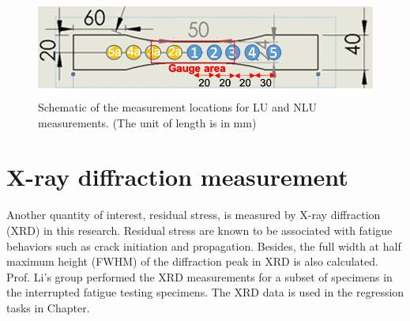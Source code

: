 \begin{figure}[tb]
  \includegraphics[width=\linewidth]{fig/specimen_measurment_locs.png}
  \caption{Schematic of the measurement locations for LU and NLU measurements. (The unit of length is in mm)}
  \label{fig: measurement locations}
\end{figure}

\section{X-ray diffraction measurement}
Another quantity of interest, residual stress, is measured by X-ray diffraction (XRD) in this research. Residual stress are known to be associated with fatigue behaviors such as crack initiation and propagation. Besides, the full width at half maximum height (FWHM) of the diffraction peak in XRD is also calculated. Prof. Li's group performed the XRD measurements for a subset of specimens in the interrupted fatigue testing specimens. The XRD data is used in the regression tasks in Chapter.
